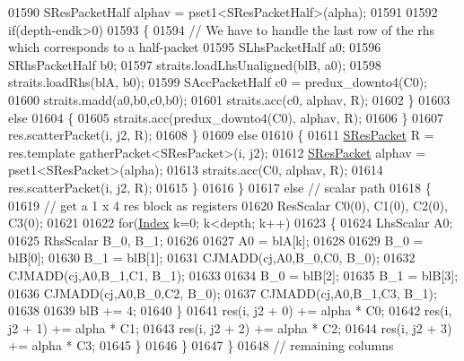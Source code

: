 \begin{DoxyCode}
01590               SResPacketHalf alphav = pset1<SResPacketHalf>(alpha);
01591 
01592               \textcolor{keywordflow}{if}(depth-endk>0)
01593               \{
01594                 \textcolor{comment}{// We have to handle the last row of the rhs which corresponds to a half-packet}
01595                 SLhsPacketHalf a0;
01596                 SRhsPacketHalf b0;
01597                 straits.loadLhsUnaligned(blB, a0);
01598                 straits.loadRhs(blA, b0);
01599                 SAccPacketHalf c0 = predux\_downto4(C0);
01600                 straits.madd(a0,b0,c0,b0);
01601                 straits.acc(c0, alphav, R);
01602               \}
01603               \textcolor{keywordflow}{else}
01604               \{
01605                 straits.acc(predux\_downto4(C0), alphav, R);
01606               \}
01607               res.scatterPacket(i, j2, R);
01608             \}
01609             \textcolor{keywordflow}{else}
01610             \{
01611               \hyperlink{class_eigen_1_1internal_1_1_tensor_lazy_evaluator_writable}{SResPacket} R = res.template gatherPacket<SResPacket>(i, j2);
01612               \hyperlink{class_eigen_1_1internal_1_1_tensor_lazy_evaluator_writable}{SResPacket} alphav = pset1<SResPacket>(alpha);
01613               straits.acc(C0, alphav, R);
01614               res.scatterPacket(i, j2, R);
01615             \}
01616           \}
01617           \textcolor{keywordflow}{else} \textcolor{comment}{// scalar path}
01618           \{
01619             \textcolor{comment}{// get a 1 x 4 res block as registers}
01620             ResScalar C0(0), C1(0), C2(0), C3(0);
01621 
01622             \textcolor{keywordflow}{for}(\hyperlink{namespace_eigen_a62e77e0933482dafde8fe197d9a2cfde}{Index} k=0; k<depth; k++)
01623             \{
01624               LhsScalar A0;
01625               RhsScalar B\_0, B\_1;
01626 
01627               A0 = blA[k];
01628 
01629               B\_0 = blB[0];
01630               B\_1 = blB[1];
01631               CJMADD(cj,A0,B\_0,C0,  B\_0);
01632               CJMADD(cj,A0,B\_1,C1,  B\_1);
01633               
01634               B\_0 = blB[2];
01635               B\_1 = blB[3];
01636               CJMADD(cj,A0,B\_0,C2,  B\_0);
01637               CJMADD(cj,A0,B\_1,C3,  B\_1);
01638               
01639               blB += 4;
01640             \}
01641             res(i, j2 + 0) += alpha * C0;
01642             res(i, j2 + 1) += alpha * C1;
01643             res(i, j2 + 2) += alpha * C2;
01644             res(i, j2 + 3) += alpha * C3;
01645           \}
01646         \}
01647       \}
01648       \textcolor{comment}{// remaining columns}

\end{DoxyCode}
